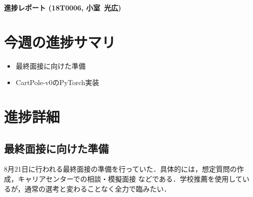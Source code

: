 \documentclass[11pt,a4paper]{jsarticle}
\def\stdid{18T0006}		%
\def\sirname{小室}		%
\def\firstname{光広}		%
\begin{document}

\noindent
\textbf{\large 進捗レポート (\stdid, \sirname\ \firstname)}		%

\section*{今週の進捗サマリ}			%

\begin{itemize}
\item 最終面接に向けた準備
\item CartPole-v0のPyTorch実装
\end{itemize}

\section{進捗詳細}					%
\subsection{最終面接に向けた準備}
8月21日に行われる最終面接の準備を行っていた．具体的には，想定質問の作成，キャリアセンターでの相談・模擬面接
などである．学校推薦を使用しているが，通常の選考と変わることなく全力で臨みたい．
\end{document}
